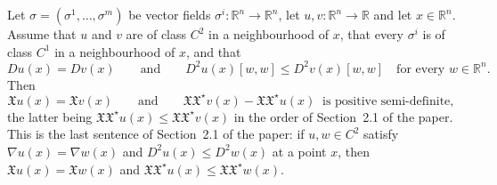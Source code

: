 \begin{lemma}
Let $\sigma=(\sigma^1,\dots,\sigma^m)$ be vector fields $\sigma^i:\mathbb{R}^n\to\mathbb{R}^n$, let
$u,v:\mathbb{R}^n\to\mathbb{R}$ and let $x\in\mathbb{R}^n$. Assume that $u$ and $v$ are of class
$C^2$ in a neighbourhood of $x$, that every $\sigma^i$ is of class $C^1$ in a neighbourhood of
$x$, and that
$$Du(x)=Dv(x)\qquad\text{and}\qquad D^2u(x)[w,w]\leq D^2v(x)[w,w]\quad\text{for every }
w\in\mathbb{R}^n .$$
Then
$$\mathfrak{X}u(x)=\mathfrak{X}v(x)\qquad\text{and}\qquad
\mathfrak{X}\mathfrak{X}^\star v(x)-\mathfrak{X}\mathfrak{X}^\star u(x)\ \text{ is positive
semi-definite},$$
the latter being $\mathfrak{X}\mathfrak{X}^\star u(x)\leq\mathfrak{X}\mathfrak{X}^\star v(x)$ in the
order of Section~2.1 of the paper. This is the last sentence of Section~2.1 of the paper: if
$u,w\in C^2$ satisfy $\nabla u(x)=\nabla w(x)$ and $D^2u(x)\leq D^2w(x)$ at a point $x$, then
$\mathfrak{X}u(x)=\mathfrak{X}w(x)$ and
$\mathfrak{X}\mathfrak{X}^\star u(x)\leq\mathfrak{X}\mathfrak{X}^\star w(x)$.
\end{lemma}
